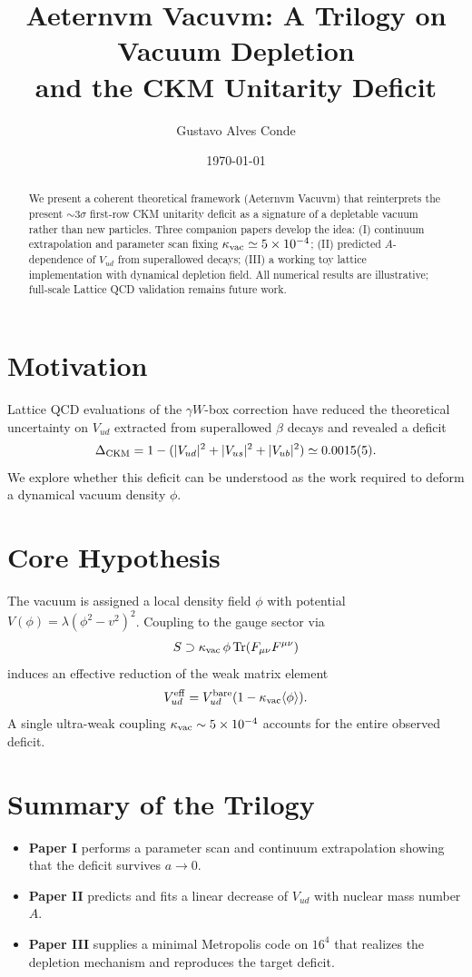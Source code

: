 \documentclass[aps,prd,preprint,amsmath,amssymb]{revtex4-2}
\title{Aeternvm Vacuvm: A Trilogy on Vacuum Depletion\\
and the CKM Unitarity Deficit}
\author{Gustavo Alves Conde}
\affiliation{Aeternvm Vacuvm Collaboration, Itagua\c{c}u, ES, Brazil}
\date{\today}
\begin{document}
\maketitle

\begin{abstract}
We present a coherent theoretical framework (Aeternvm Vacuvm) that reinterprets the present $\sim3\sigma$ first-row CKM unitarity deficit as a signature of a depletable vacuum rather than new particles. Three companion papers develop the idea: (I) continuum extrapolation and parameter scan fixing $\kappa_{\rm vac}\simeq5\times10^{-4}$; (II) predicted $A$-dependence of $V_{ud}$ from superallowed decays; (III) a working toy lattice implementation with dynamical depletion field. All numerical results are illustrative; full-scale Lattice QCD validation remains future work.
\end{abstract}

\section{Motivation}
Lattice QCD evaluations of the $\gamma W$-box correction have reduced the theoretical uncertainty on $V_{ud}$ extracted from superallowed $\beta$ decays and revealed a deficit
\begin{equation}
\Delta_{\rm CKM}=1-(|V_{ud}|^2+|V_{us}|^2+|V_{ub}|^2)\simeq0.0015(5).
\end{equation}
We explore whether this deficit can be understood as the work required to deform a dynamical vacuum density $\phi$.

\section{Core Hypothesis}
The vacuum is assigned a local density field $\phi$ with potential $V(\phi)=\lambda(\phi^2-v^2)^2$. Coupling to the gauge sector via
\begin{equation}
S\supset\kappa_{\rm vac}\,\phi\,{\rm Tr}(F_{\mu\nu}F^{\mu\nu})
\end{equation}
induces an effective reduction of the weak matrix element
\begin{equation}
V_{ud}^{\rm eff}=V_{ud}^{\rm bare}(1-\kappa_{\rm vac}\langle\phi\rangle).
\end{equation}
A single ultra-weak coupling $\kappa_{\rm vac}\sim5\times10^{-4}$ accounts for the entire observed deficit.

\section{Summary of the Trilogy}
\begin{itemize}
\item \textbf{Paper I} performs a parameter scan and continuum extrapolation showing that the deficit survives $a\to0$.
\item \textbf{Paper II} predicts and fits a linear decrease of $V_{ud}$ with nuclear mass number $A$.
\item \textbf{Paper III} supplies a minimal Metropolis code on $16^4$ that realizes the depletion mechanism and reproduces the target deficit.
\end{itemize}
\end{document}
